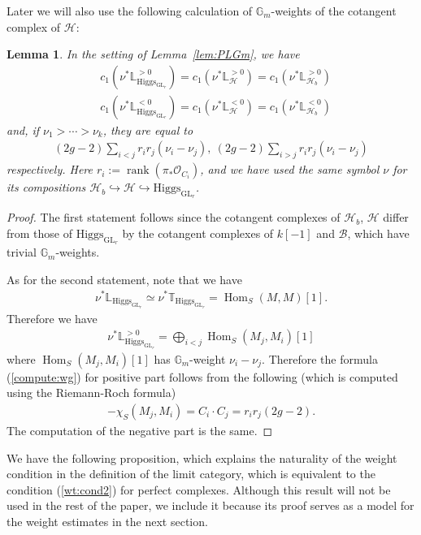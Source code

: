 \documentclass[11pt,oneside,a4paper,mathscr]{amsart}
\newtheorem{lemma}[thm]{Lemma}
\theoremstyle{definition}
\newcommand{\cH}{\mathcal{H}}
\newcommand{\cB}{\mathcal{B}}
\newcommand{\cO}{\mathcal{O}}
\newcommand{\Hom}{\operatorname{Hom}}
\newcommand{\GL}{\operatorname{GL}}
\newcommand{\Hig}{\mathrm{Higgs}}
\begin{document}
Later we will also use the following calculation of $\mathbb{G}_m$-weights of the cotangent complex of $\cH$: 
\begin{lemma}\label{lem:Gmwt:L}
In the setting of Lemma~\ref{lem:PLGm}, 
we have 
\begin{align*}
    &c_1(\nu^* \mathbb{L}_{\Hig_{\GL_r}}^{>0})=c_1(\nu^* \mathbb{L}_{\cH}^{>0})=c_1(\nu^{*}\mathbb{L}_{\cH_b}^{>0}) \\
     &c_1(\nu^* \mathbb{L}_{\Hig_{\GL_r}}^{<0})=c_1(\nu^* \mathbb{L}_{\cH}^{<0})=c_1(\nu^{*}\mathbb{L}_{\cH_b}^{<0}) 
\end{align*}
and, if $\nu_1>\cdots>\nu_k$, they are equal to 
\begin{align}\label{compute:wg}
(2g-2)\sum_{i<j}r_i r_j (\nu_i-\nu_j), \ 
(2g-2)\sum_{i>j}r_i r_j (\nu_i-\nu_j)
    \end{align}
    respectively. 
    Here $r_i:=\operatorname{rank}(\pi_{*}\cO_{C_i})$, and we have used the same symbol $\nu$ for its compositions 
    $\cH_b \hookrightarrow \cH \hookrightarrow \Hig_{\GL_r}$. 
\end{lemma}
\begin{proof}
The first statement follows since the cotangent complexes of 
$\cH_b$, $\cH$ differ from those of $\Hig_{\GL_r}$ by the cotangent complexes of 
$k[-1]$ and $\cB$, which have trivial $\mathbb{G}_m$-weights. 

As for the second statement, note that we have 
\begin{align*}
    \nu^* \mathbb{L}_{\Hig_{\GL_r}} \simeq
     \nu^* \mathbb{T}_{\Hig_{\GL_r}}=
    \Hom_S(M, M)[1].
\end{align*}
Therefore we have 
\begin{align*}
     \nu^* \mathbb{L}_{\Hig_{\GL_r}}^{>0}=
     \bigoplus_{i<j}\Hom_S(M_j, M_i)[1]
\end{align*}
where $\Hom_S(M_j, M_i)[1]$ has $\mathbb{G}_m$-weight $\nu_i-\nu_j$. 
    Therefore the formula (\ref{compute:wg}) for positive part follows from 
    the following (which is computed using the Riemann-Roch formula)
    \begin{align*}
        -\chi_S(M_j, M_i)=C_i \cdot C_j=r_i r_j(2g-2).
    \end{align*}
    The computation of the negative part is the same. 
\end{proof}

We have the following proposition, which explains the naturality of the weight condition in the definition of the limit category, which is equivalent to the condition (\ref{wt:cond2}) for perfect complexes. Although this result will not be used in the rest of the paper, we include it because its proof serves as a model for the weight estimates in the next section.
\end{document}
